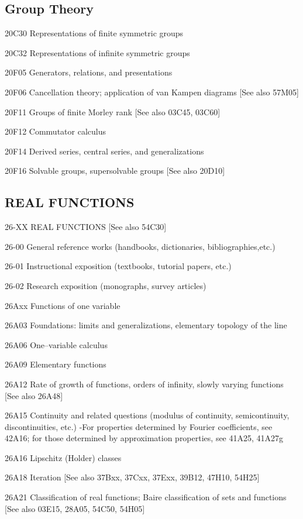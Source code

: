 \documentclass[12pt]{article}
\theoremstyle{plain}
\theoremstyle{definition}
\numberwithin{equation}{section}
\begin{document}
{\subsection{Group Theory}

20C30 Representations of finite symmetric groups

20C32 Representations of infinite symmetric groups

20F05 Generators, relations, and presentations

20F06 Cancellation theory; application of van Kampen diagrams [See also 57M05]

20F11 Groups of finite Morley rank [See also 03C45, 03C60]

20F12 Commutator calculus

20F14 Derived series, central series, and generalizations

20F16 Solvable groups, supersolvable groups [See also 20D10]


\subsection{REAL FUNCTIONS}

26-XX REAL FUNCTIONS [See also 54C30]

26-00 General reference works (handbooks, dictionaries, bibliographies,etc.)

26-01 Instructional exposition (textbooks, tutorial papers, etc.)

26-02 Research exposition (monographs, survey articles)

26Axx Functions of one variable

26A03 Foundations: limits and generalizations, elementary topology of the line

26A06 One--variable calculus

26A09 Elementary functions

26A12 Rate of growth of functions, orders of infinity, slowly varying functions [See also 26A48]

26A15 Continuity and related questions (modulus of continuity, semicontinuity, discontinuities, etc.)
 -For properties determined by Fourier coefficients, see 42A16; for those determined by approximation properties, see 41A25, 41A27g

26A16 Lipschitz (Holder) classes

26A18 Iteration [See also 37Bxx, 37Cxx, 37Exx, 39B12, 47H10, 54H25]

26A21 Classification of real functions; Baire classification of sets and functions [See also 03E15, 28A05, 54C50, 54H05]

}
\end{document}
